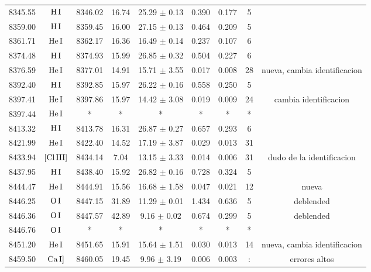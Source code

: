\documentclass{article}
\begin{document}
\begin{table*}
\begin{adjustbox}{width=\textwidth}
\begin{tabular}{ccccccccc}
8345.55 & $\mbox{H}\thinspace \mbox{I}$ & 8346.02 & 16.74 & 25.29 $\pm$ 0.13 & 0.390 & 0.177 & 5 &  \\
8359.00 & $\mbox{H}\thinspace \mbox{I}$ & 8359.45 & 16.00 & 27.15 $\pm$ 0.13 & 0.464 & 0.209 & 5 &  \\
8361.71 & $\mbox{He}\thinspace \mbox{I}$ & 8362.17 & 16.36 & 16.49 $\pm$ 0.14 & 0.237 & 0.107 & 6 &  \\
8374.48 & $\mbox{H}\thinspace \mbox{I}$ & 8374.93 & 15.99 & 26.85 $\pm$ 0.32 & 0.504 & 0.227 & 6 &  \\
8376.59 & $\mbox{He}\thinspace \mbox{I}$ & 8377.01 & 14.91 & 15.71 $\pm$ 3.55 & 0.017 & 0.008 & 28 &  nueva, cambia identificacion \\
8392.40 & $\mbox{H}\thinspace \mbox{I}$ & 8392.85 & 15.97 & 26.22 $\pm$ 0.16 & 0.558 & 0.250 & 5 &  \\
8397.41 & $\mbox{He}\thinspace \mbox{I}$ & 8397.86 & 15.97 & 14.42 $\pm$ 3.08 & 0.019 & 0.009 & 24 &  cambia identificacion \\
8397.44 & $\mbox{He}\thinspace \mbox{I}$ & * & * & * & * & * & * &  \\
8413.32 & $\mbox{H}\thinspace \mbox{I}$ & 8413.78 & 16.31 & 26.87 $\pm$ 0.27 & 0.657 & 0.293 & 6 &  \\
8421.99 & $\mbox{He}\thinspace \mbox{I}$ & 8422.40 & 14.52 & 17.19 $\pm$ 3.87 & 0.029 & 0.013 & 31 &  \\
8433.94 & $\mbox{[Cl}\thinspace \mbox{III]}$ & 8434.14 & 7.04 & 13.15 $\pm$ 3.33 & 0.014 & 0.006 & 31 &  dudo de la identificacion \\
8437.95 & $\mbox{H}\thinspace \mbox{I}$ & 8438.40 & 15.92 & 26.82 $\pm$ 0.16 & 0.728 & 0.324 & 5 &  \\
8444.47 & $\mbox{He}\thinspace \mbox{I}$ & 8444.91 & 15.56 & 16.68 $\pm$ 1.58 & 0.047 & 0.021 & 12 &  nueva \\
8446.25 & $\mbox{O}\thinspace \mbox{I}$ & 8447.15 & 31.89 & 11.29 $\pm$ 0.01 & 1.434 & 0.636 & 5 &  deblended \\
8446.36 & $\mbox{O}\thinspace \mbox{I}$ & 8447.57 & 42.89 & 9.16 $\pm$ 0.02 & 0.674 & 0.299 & 5 &  deblended \\
8446.76 & $\mbox{O}\thinspace \mbox{I}$ & * & * & * & * & * & * &  \\
8451.20 & $\mbox{He}\thinspace \mbox{I}$ & 8451.65 & 15.91 & 15.64 $\pm$ 1.51 & 0.030 & 0.013 & 14 &  nueva, cambia identificacion \\
8459.50 & $\mbox{Ca}\thinspace \mbox{I]}$ & 8460.05 & 19.45 & 9.96 $\pm$ 3.19 & 0.006 & 0.003 & : &  errores altos \\

\end{tabular}
\end{adjustbox}
\end{table*}
\end{document}
